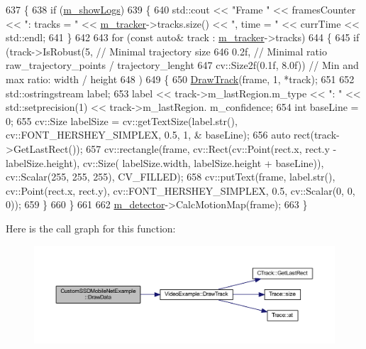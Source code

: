 \begin{DoxyCode}
637     \{
638         \textcolor{keywordflow}{if} (\mbox{\hyperlink{class_video_example_af3bfe51e3e1452bb084016602c668463}{m\_showLogs}})
639         \{
640             std::cout << \textcolor{stringliteral}{"Frame "} << framesCounter << \textcolor{stringliteral}{": tracks = "} << \mbox{\hyperlink{class_video_example_a7c58cd8c883981b2e645d1a3d8edf76a}{m\_tracker}}->tracks.size() <<
       \textcolor{stringliteral}{", time = "} << currTime << std::endl;
641         \}
642 
643         \textcolor{keywordflow}{for} (\textcolor{keyword}{const} \textcolor{keyword}{auto}& track : \mbox{\hyperlink{class_video_example_a7c58cd8c883981b2e645d1a3d8edf76a}{m\_tracker}}->tracks)
644         \{
645             \textcolor{keywordflow}{if} (track->IsRobust(5,                           \textcolor{comment}{// Minimal trajectory size}
646                 0.2f,                        \textcolor{comment}{// Minimal ratio raw\_trajectory\_points / trajectory\_lenght}
647                 cv::Size2f(0.1f, 8.0f))      \textcolor{comment}{// Min and max ratio: width / height}
648                 )
649             \{
650                 \mbox{\hyperlink{class_video_example_a84a040bc87b915c5ee18c5d11235f40c}{DrawTrack}}(frame, 1, *track);
651 
652                 std::ostringstream label;
653                 label << track->m\_lastRegion.m\_type << \textcolor{stringliteral}{": "} << std::setprecision(1) << track->m\_lastRegion.
      m\_confidence;
654                 \textcolor{keywordtype}{int} baseLine = 0;
655                 cv::Size labelSize = cv::getTextSize(label.str(), cv::FONT\_HERSHEY\_SIMPLEX, 0.5, 1, &
      baseLine);
656                 \textcolor{keyword}{auto} rect(track->GetLastRect());
657                 cv::rectangle(frame, cv::Rect(cv::Point(rect.x, rect.y - labelSize.height), cv::Size(
      labelSize.width, labelSize.height + baseLine)), cv::Scalar(255, 255, 255), CV\_FILLED);
658                 cv::putText(frame, label.str(), cv::Point(rect.x, rect.y), cv::FONT\_HERSHEY\_SIMPLEX, 0.5, 
      cv::Scalar(0, 0, 0));
659             \}
660         \}
661 
662         \mbox{\hyperlink{class_video_example_a00fee4b18b68d605b87051f3bdaa1c92}{m\_detector}}->CalcMotionMap(frame);
663     \}
\end{DoxyCode}
Here is the call graph for this function\+:\nopagebreak
\begin{figure}[H]
\begin{center}
\leavevmode
\includegraphics[width=350pt]{class_custom_s_s_d_mobile_net_example_a34a324a8390365c4e2c18ac049986df5_cgraph}
\end{center}
\end{figure}
